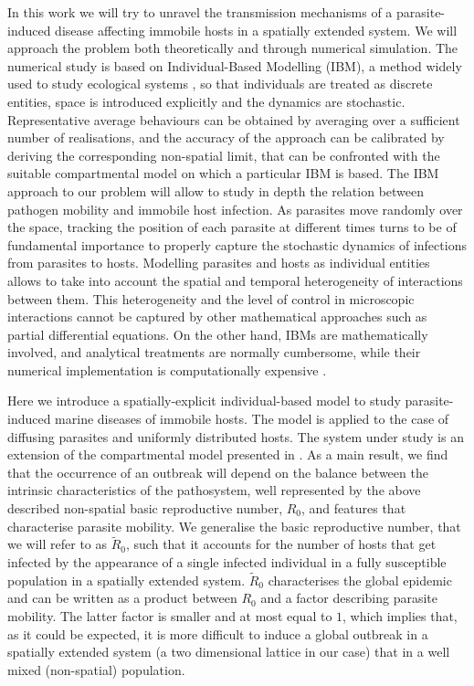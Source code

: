In this work we will try to unravel the transmission mechanisms of a
parasite-induced disease affecting immobile hosts in a spatially extended
system. We will approach the problem both theoretically and through numerical
simulation. The numerical study is based on Individual-Based Modelling (IBM), a
method widely used to study ecological systems \cite{Grimm2005}, so that
individuals are treated as discrete entities, space is introduced explicitly
and the dynamics are stochastic. Representative average behaviours can be
obtained by averaging over a sufficient number of realisations, and the
accuracy of the approach can be calibrated by deriving the corresponding
non-spatial limit, that can be confronted with the suitable compartmental model
on which a particular IBM is based. The IBM approach to our problem will allow
to study in depth the relation between pathogen mobility and immobile host
infection. As parasites move randomly over the space, tracking the position of
each parasite at different times turns to be of fundamental importance to
properly capture the stochastic dynamics of infections from parasites to hosts.
Modelling parasites and hosts as individual entities allows to take into
account the spatial and temporal heterogeneity of interactions between them.
This heterogeneity and the level of control in microscopic interactions cannot
be captured by other mathematical approaches such as partial differential
equations. On the other hand, IBMs are mathematically involved, and analytical
treatments are normally cumbersome, while their numerical implementation is
computationally expensive \cite{Breckling1900}.

Here we introduce a spatially-explicit individual-based model to study
parasite-induced marine diseases of immobile hosts. The model is applied  to
the case of diffusing parasites and uniformly distributed hosts. The system
under study is an extension of the compartmental model presented in
\cite{GimenezRomero2021}. As a main result, we find that the occurrence of an
outbreak will depend on the balance between the intrinsic characteristics of
the pathosystem, well represented by the above described non-spatial basic
reproductive number, $R_0$, and features that characterise parasite mobility.
We generalise the basic reproductive number, that we will refer to as
$\tilde{R}_0$, such that it accounts for the number of hosts that get infected
by the appearance of a single infected individual in a fully susceptible
population in a spatially extended system. $\tilde{R}_0$ characterises the
global epidemic and can be written as a product between $R_0$ and a factor
describing parasite mobility. The latter factor is smaller and at most equal to
$1$, which implies that, as it could be expected, it is more difficult to
induce a global outbreak in a spatially extended system (a two dimensional
lattice in our case) that in a well mixed (non-spatial) population.

